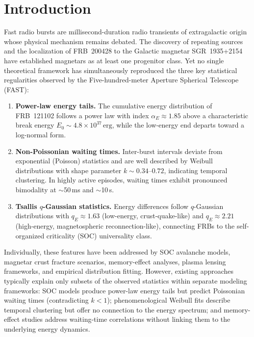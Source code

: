 \documentclass[twocolumn]{article}
\newcommand{\frb}[1]{FRB~#1}
\newcommand{\erg}{\,\mathrm{erg}}
\begin{document}
\section{Introduction}

Fast radio bursts are millisecond-duration radio transients of extragalactic origin whose physical mechanism remains debated\cite{lorimer2007,petroff2022}. The discovery of repeating sources\cite{spitler2016} and the localization of \frb{200428} to the Galactic magnetar SGR~1935+2154\cite{bochenek2020,chime2020sgr} have established magnetars as at least one progenitor class. Yet no single theoretical framework has simultaneously reproduced the three key statistical regularities observed by the Five-hundred-meter Aperture Spherical Telescope (FAST)\cite{nan2011}:

\begin{enumerate}
\item \textbf{Power-law energy tails.} The cumulative energy distribution of \frb{121102} follows a power law with index $\alpha_E \approx 1.85$ above a characteristic break energy $E_0 \sim 4.8 \times 10^{37}\erg$, while the low-energy end departs toward a log-normal form\cite{li2021}.

\item \textbf{Non-Poissonian waiting times.} Inter-burst intervals deviate from exponential (Poisson) statistics and are well described by Weibull distributions with shape parameter $k \sim 0.34$--$0.72$, indicating temporal clustering\cite{li2021,xu2022}. In highly active episodes, waiting times exhibit pronounced bimodality at $\sim$50\,ms and $\sim$10\,s\cite{xu2022,zhang2022}.

\item \textbf{Tsallis $q$-Gaussian statistics.} Energy differences follow $q$-Gaussian distributions with $q_E \approx 1.63$ (low-energy, crust-quake-like) and $q_E \approx 2.21$ (high-energy, magnetospheric reconnection-like)\cite{lin2019,sang2022}, connecting FRBs to the self-organized criticality (SOC) universality class.
\end{enumerate}

Individually, these features have been addressed by SOC avalanche models\cite{wang2017,aschwanden2016}, magnetar crust fracture scenarios\cite{cheng2020,wadiasingh2019}, memory-effect analyses\cite{cruces2023,tabor2024}, plasma lensing frameworks\cite{li2024plasma}, and empirical distribution fitting\cite{lu2020,gourdji2019}. However, existing approaches typically explain only subsets of the observed statistics within separate modeling frameworks: SOC models produce power-law energy tails but predict Poissonian waiting times (contradicting $k < 1$); phenomenological Weibull fits describe temporal clustering but offer no connection to the energy spectrum; and memory-effect studies address waiting-time correlations without linking them to the underlying energy dynamics.
\end{document}
